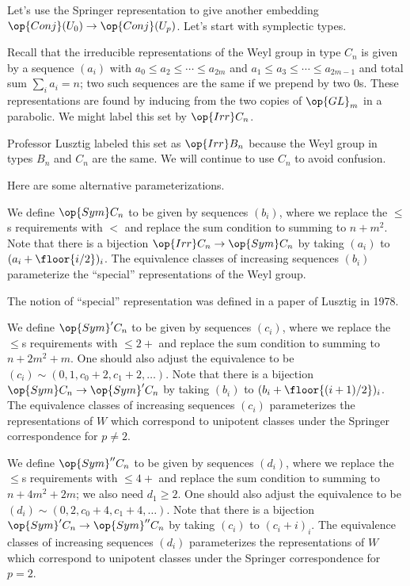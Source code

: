 \documentclass[../notes.tex]{subfiles}
\begin{document}
Let's use the Springer representation to give another embedding $\op{Conj}(U_0)\to\op{Conj}(U_p)$. Let's start with symplectic types.
\begin{notation}
	Recall that the irreducible representations of the Weyl group in type $C_n$ is given by a sequence $(a_i)$ with $a_0\le a_2\le\cdots\le a_{2m}$ and $a_1\le a_3\le\cdots\le a_{2m-1}$ and total sum $\sum_ia_i=n$; two such sequences are the same if we prepend by two $0$s. These representations are found by inducing from the two copies of $\op{GL}_m$ in a parabolic. We might label this set by $\op{Irr}C_n$.
\end{notation}
\begin{remark}
	Professor Lusztig labeled this set as $\op{Irr}B_n$ because the Weyl group in types $B_n$ and $C_n$ are the same. We will continue to use $C_n$ to avoid confusion.
\end{remark}
Here are some alternative parameterizations.
\begin{notation}
	We define $\op{Sym}C_n$ to be given by sequences $(b_i)$, where we replace the $\le$s requirements with $<$ and replace the sum condition to summing to $n+m^2$. Note that there is a bijection $\op{Irr}C_n\to\op{Sym}C_n$ by taking $(a_i)$ to $(a_i+\floor{i/2})_i$. The equivalence classes of increasing sequences $(b_i)$ parameterize the ``special'' representations of the Weyl group.
\end{notation}
The notion of ``special'' representation was defined in a paper of Lusztig in 1978.
\begin{notation}
	We define $\op{Sym}'C_n$ to be given by sequences $(c_i)$, where we replace the $\le$s requirements with $\le2+$ and replace the sum condition to summing to $n+2m^2+m$. One should also adjust the equivalence to be $(c_i)\sim(0,1,c_0+2,c_1+2,\ldots)$. Note that there is a bijection $\op{Sym}C_n\to\op{Sym}'C_n$ by taking $(b_i)$ to $(b_i+\floor{(i+1)/2})_i$. The equivalence classes of increasing sequences $(c_i)$ parameterizes the representations of $W$ which correspond to unipotent classes under the Springer correspondence for $p\ne2$.
\end{notation}
\begin{notation}
	We define $\op{Sym}''C_n$ to be given by sequences $(d_i)$, where we replace the $\le$s requirements with $\le4+$ and replace the sum condition to summing to $n+4m^2+2m$; we also need $d_1\ge2$. One should also adjust the equivalence to be $(d_i)\sim(0,2,c_0+4,c_1+4,\ldots)$. Note that there is a bijection $\op{Sym}'C_n\to\op{Sym}''C_n$ by taking $(c_i)$ to $(c_i+i)_i$. The equivalence classes of increasing sequences $(d_i)$ parameterizes the representations of $W$ which correspond to unipotent classes under the Springer correspondence for $p=2$.
\end{notation}
\end{document}
